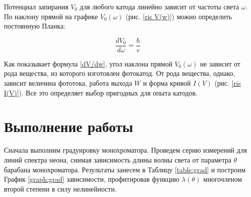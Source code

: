 \documentclass[a4paper, 12pt]{article}
\begin{document}
	Потенциал запирания $ V_0 $ для любого катода линейно зависит от
	частоты света $ \omega $. По наклону прямой на графике $ V_0(\omega) $ (рис. \ref{ris V(w)}) можно определить постоянную Планка:
	
	\begin{equation}\label{dV/dw}
	\dfrac{dV_0}{d\omega} = \dfrac{\hbar}{e}
	\end{equation}
	
	Как показывает формула \eqref{dV/dw}, угол наклона прямой $ V_0(\omega) $ не зависит от рода вещества, из которого изготовлен фотокатод. От рода вещества, однако, зависит величина фототока, работа выхода $ W $ и форма кривой $ I(V) $ (рис. \ref{ris I(V)}). Все это определяет выбор пригодных для
	опыта катодов.


    \section*{Выполнение работы}
	
	Сначала выполним градуировку монохроматора. Проведем серию измерений для линий спектра неона, снимая зависимость длины волны света от параметра $ \theta $ барабана монохроматора. Результаты занесем в Таблицу \ref{table:grad} и построим График \ref{graph:grad} зависимости, профитировав функцию $ \lambda (\theta) $ многочленом второй степени в силу нелинейности. 
	
\end{document}
